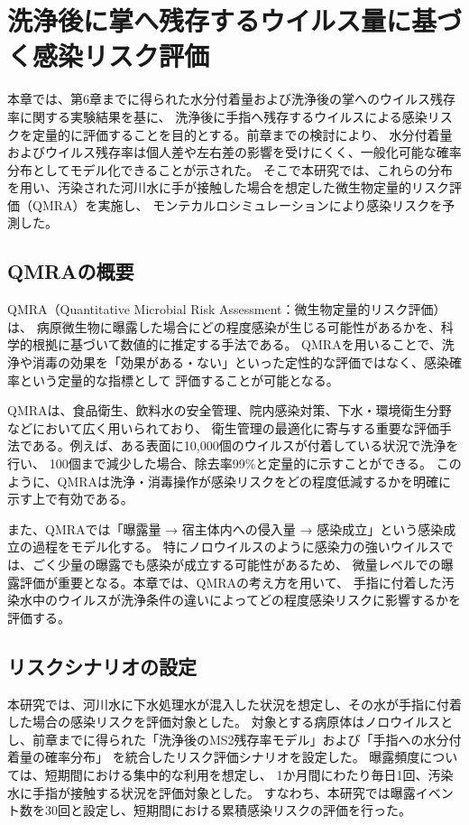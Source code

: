 \chapter{洗浄後に掌へ残存するウイルス量に基づく感染リスク評価}

本章では、第6章までに得られた水分付着量および洗浄後の掌へのウイルス残存率に関する実験結果を基に、
洗浄後に手指へ残存するウイルスによる感染リスクを定量的に評価することを目的とする。前章までの検討により、
水分付着量およびウイルス残存率は個人差や左右差の影響を受けにくく、一般化可能な確率分布としてモデル化できることが示された。
そこで本研究では、これらの分布を用い、汚染された河川水に手が接触した場合を想定した微生物定量的リスク評価（QMRA）を実施し、
モンテカルロシミュレーションにより感染リスクを予測した。

\section{QMRAの概要}

QMRA（Quantitative Microbial Risk Assessment：微生物定量的リスク評価）は、
病原微生物に曝露した場合にどの程度感染が生じる可能性があるかを、科学的根拠に基づいて数値的に推定する手法である。
QMRAを用いることで、洗浄や消毒の効果を「効果がある・ない」といった定性的な評価ではなく、感染確率という定量的な指標として
評価することが可能となる。

QMRAは、食品衛生、飲料水の安全管理、院内感染対策、下水・環境衛生分野などにおいて広く用いられており、
衛生管理の最適化に寄与する重要な評価手法である。例えば、ある表面に10,000個のウイルスが付着している状況で洗浄を行い、
100個まで減少した場合、除去率99\%と定量的に示すことができる。
このように、QMRAは洗浄・消毒操作が感染リスクをどの程度低減するかを明確に示す上で有効である。

また、QMRAでは「曝露量 → 宿主体内への侵入量 → 感染成立」という感染成立の過程をモデル化する。
特にノロウイルスのように感染力の強いウイルスでは、ごく少量の曝露でも感染が成立する可能性があるため、
微量レベルでの曝露評価が重要となる。本章では、QMRAの考え方を用いて、
手指に付着した汚染水中のウイルスが洗浄条件の違いによってどの程度感染リスクに影響するかを評価する。

\section{リスクシナリオの設定}

本研究では、河川水に下水処理水が混入した状況を想定し、その水が手指に付着した場合の感染リスクを評価対象とした。
対象とする病原体はノロウイルスとし、前章までに得られた「洗浄後のMS2残存率モデル」および「手指への水分付着量の確率分布」
を統合したリスク評価シナリオを設定した。
曝露頻度については、短期間における集中的な利用を想定し、
1か月間にわたり毎日1回、汚染水に手指が接触する状況を評価対象とした。
すなわち、本研究では曝露イベント数を30回と設定し、短期間における累積感染リスクの評価を行った。

